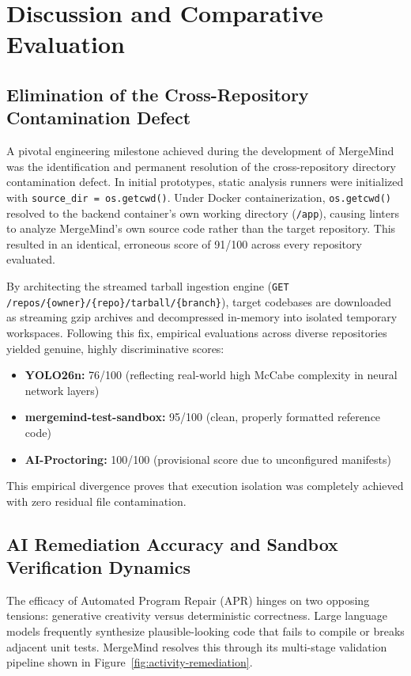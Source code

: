 \chapter{Discussion and Comparative Evaluation}
\label{chap:discussion-evaluation}

\section{Elimination of the Cross-Repository Contamination Defect}
\label{sec:disc-contamination}

A pivotal engineering milestone achieved during the development of MergeMind was the identification and permanent resolution of the cross-repository directory contamination defect. In initial prototypes, static analysis runners were initialized with \texttt{source\_dir = os.getcwd()}. Under Docker containerization, \texttt{os.getcwd()} resolved to the backend container's own working directory (\texttt{/app}), causing linters to analyze MergeMind's own source code rather than the target repository. This resulted in an identical, erroneous score of 91/100 across every repository evaluated.

By architecting the streamed tarball ingestion engine (\texttt{GET /repos/\{owner\}/\{repo\}/tarball/\{branch\}}), target codebases are downloaded as streaming gzip archives and decompressed in-memory into isolated temporary workspaces. Following this fix, empirical evaluations across diverse repositories yielded genuine, highly discriminative scores:
\begin{itemize}
    \item \textbf{YOLO26n:} 76/100 (reflecting real-world high McCabe complexity in neural network layers)
    \item \textbf{mergemind-test-sandbox:} 95/100 (clean, properly formatted reference code)
    \item \textbf{AI-Proctoring:} 100/100 (provisional score due to unconfigured manifests)
\end{itemize}
This empirical divergence proves that execution isolation was completely achieved with zero residual file contamination.

\section{AI Remediation Accuracy and Sandbox Verification Dynamics}
\label{sec:disc-remediation-accuracy}

The efficacy of Automated Program Repair (APR) hinges on two opposing tensions: generative creativity versus deterministic correctness. Large language models frequently synthesize plausible-looking code that fails to compile or breaks adjacent unit tests. MergeMind resolves this through its multi-stage validation pipeline shown in Figure~\ref{fig:activity-remediation}.


